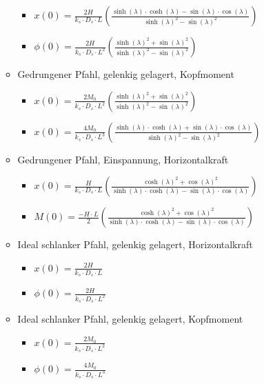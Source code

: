 \documentclass[fleqn,twoside]{article}
\begin{document}
\begin{itemize}
\begin{itemize}
\begin{itemize}
            \item $x(0)=\frac{2H}{k_s\cdot D_s\cdot L}\left(\frac{\sinh(\lambda)\cdot\cosh(\lambda)-\sin(\lambda)\cdot\cos(\lambda)}{\sinh(\lambda)^2-\sin(\lambda)^2}\right)$
            \item $\phi(0)=\frac{2H}{k_s\cdot D_s\cdot L^2}\left(\frac{\sinh(\lambda)^2+\sin(\lambda)^2}{\sinh(\lambda)^2-\sin(\lambda)^2}\right)$
        \end{itemize}
        \item Gedrungener Pfahl, gelenkig gelagert, Kopfmoment
        \begin{itemize}
            \item $x(0)=\frac{2M_0}{k_s\cdot D_s\cdot L^2}\left(\frac{\sinh(\lambda)^2+\sin(\lambda)^2}{\sinh(\lambda)^2-\sin(\lambda)^2}\right)$
            \item $x(0)=\frac{4M_0}{k_s\cdot D_s\cdot L^3}\left(\frac{\sinh(\lambda)\cdot\cosh(\lambda)+\sin(\lambda)\cdot\cos(\lambda)}{\sinh(\lambda)^2-\sin(\lambda)^2}\right)$
        \end{itemize}
        \item Gedrungener Pfahl, Einspannung, Horizontalkraft
        \begin{itemize}
            \item $x(0)=\frac{H}{k_s\cdot D_s\cdot L}\left(\frac{\cosh(\lambda)^2+\cos(\lambda)^2}{\sinh(\lambda)\cdot\cosh(\lambda)-\sin(\lambda)\cdot\cos(\lambda)}\right)$
            \item $M(0)=\frac{-H\cdot L}{2}\left(\frac{\cosh(\lambda)^2+\cos(\lambda)^2}{\sinh(\lambda)\cdot\cosh(\lambda)-\sin(\lambda)\cdot\cos(\lambda)}\right)$
        \end{itemize}
        \item Ideal schlanker Pfahl, gelenkig gelagert, Horizontalkraft
        \begin{itemize}
            \item $x(0)=\frac{2H}{k_s\cdot D_s\cdot L}$
            \item $\phi(0)=\frac{2H}{k_s\cdot D_s\cdot L^2}$
        \end{itemize}
        \item Ideal schlanker Pfahl, gelenkig gelagert, Kopfmoment
        \begin{itemize}
            \item $x(0)=\frac{2M_0}{k_s\cdot D_s\cdot L^2}$
            \item $\phi(0)=\frac{4M_0}{k_s\cdot D_s\cdot L^3}$
        \end{itemize}

\end{itemize}
\end{itemize}
\end{document}

